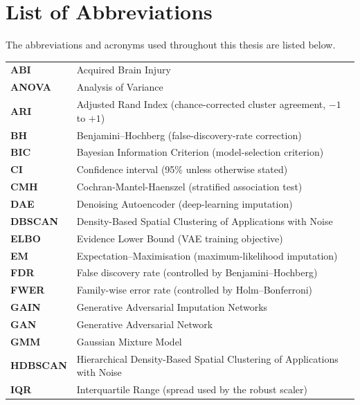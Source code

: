 
\chapter{List of Abbreviations}

\label{AppendixAbbrev}

The abbreviations and acronyms used throughout this thesis are listed below.

\begin{longtable}{@{}l p{\dimexpr\textwidth-3.2cm\relax}@{}}
\textbf{ABI}        & Acquired Brain Injury \\
\textbf{ANOVA}      & Analysis of Variance \\
\textbf{ARI}        & Adjusted Rand Index (chance-corrected cluster agreement, $-1$ to $+1$) \\
\textbf{BH}         & Benjamini--Hochberg (false-discovery-rate correction) \\
\textbf{BIC}        & Bayesian Information Criterion (model-selection criterion) \\
\textbf{CI}         & Confidence interval (95\% unless otherwise stated) \\
\textbf{CMH}        & Cochran-Mantel-Haenszel (stratified association test) \\
\textbf{DAE}        & Denoising Autoencoder (deep-learning imputation) \\
\textbf{DBSCAN}     & Density-Based Spatial Clustering of Applications with Noise \\
\textbf{ELBO}       & Evidence Lower Bound (VAE training objective) \\
\textbf{EM}         & Expectation--Maximisation (maximum-likelihood imputation) \\
\textbf{FDR}        & False discovery rate (controlled by Benjamini--Hochberg) \\
\textbf{FWER}       & Family-wise error rate (controlled by Holm--Bonferroni) \\
\textbf{GAIN}       & Generative Adversarial Imputation Networks \\
\textbf{GAN}        & Generative Adversarial Network \\
\textbf{GMM}        & Gaussian Mixture Model \\
\textbf{HDBSCAN}    & Hierarchical Density-Based Spatial Clustering of Applications with Noise \\
\textbf{IQR}        & Interquartile Range (spread used by the robust scaler) \\

\end{longtable}
